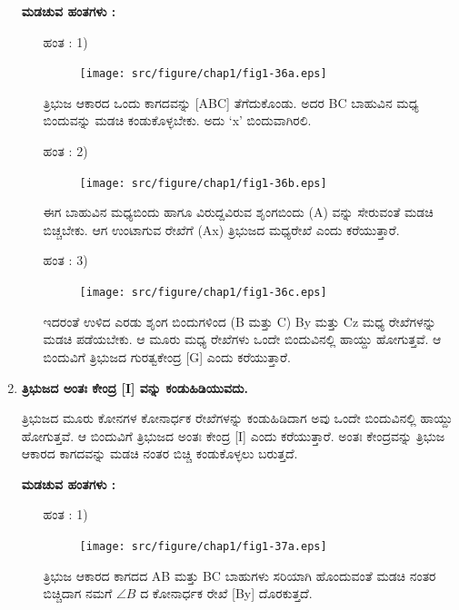 \begin{enumerate}
    \noindent
 \textbf{ಮಡಚುವ ಹಂತಗಳು :}
 
 \begin{itemize}
 \item[ಹಂತ : 1)] 
 ~
 \begin{figure}[H]
\centering
\texttt{[image: src/figure/chap1/fig1-36a.eps]}
\end{figure}
 
ತ್ರಿಭುಜ ಆಕಾರದ ಒಂದು ಕಾಗದವನ್ನು [ABC] ತೆಗೆದುಕೊಂಡು. ಅದರ BC ಬಾಹುವಿನ ಮಧ್ಯ ಬಿಂದುವನ್ನು ಮಡಚಿ ಕಂಡುಕೊಳ್ಳಬೇಕು. ಅದು  `x' ಬಿಂದುವಾಗಿರಲಿ. 
 
 \item[ಹಂತ : 2)]
 ~
 \begin{figure}[H]
\centering
\texttt{[image: src/figure/chap1/fig1-36b.eps]}
\end{figure}
 
 ಈಗ ಬಾಹುವಿನ ಮಧ್ಯಬಿಂದು ಹಾಗೂ ವಿರುದ್ದವಿರುವ ಶೃಂಗಬಿಂದು (A) ವನ್ನು ಸೇರುವಂತೆ ಮಡಚಿ ಬಿಚ್ಚಬೇಕು. ಆಗ ಉಂಟಾಗುವ ರೇಖೆಗೆ (Ax) ತ್ರಿಭುಜದ ಮಧ್ಯರೇಖೆ ಎಂದು ಕರೆಯುತ್ತಾರೆ. 
 
 \item[ಹಂತ : 3)]
 ~
 \begin{figure}[H]
\centering
\texttt{[image: src/figure/chap1/fig1-36c.eps]}
\end{figure}
 
 ಇದರಂತೆ ಉಳಿದ ಎರಡು ಶೃಂಗ ಬಿಂದುಗಳಿಂದ (B ಮತ್ತು C) By ಮತ್ತು  Cz ಮಧ್ಯ ರೇಖೆಗಳನ್ನು ಮಡಚಿ ಪಡೆಯಬೇಕು. ಆ ಮೂರು ಮಧ್ಯ ರೇಖೆಗಳು ಒಂದೇ ಬಿಂದುವಿನಲ್ಲಿ  ಹಾಯ್ದು ಹೋಗುತ್ತವೆ. ಆ ಬಿಂದುವಿಗೆ ತ್ರಿಭುಜದ ಗುರತ್ವಕೇಂದ್ರ  [G] ಎಂದು ಕರೆಯುತ್ತಾರೆ. 
  \end{itemize}
 
 \item \textbf{ತ್ರಿಭುಜದ ಅಂತಃ ಕೇಂದ್ರ [I] ವನ್ನು ಕಂಡುಹಿಡಿಯುವದು. }  
 
 ತ್ರಿಭುಜದ ಮೂರು ಕೋನಗಳ ಕೋನಾರ್ಧಕ ರೇಖೆಗಳನ್ನು ಕಂಡುಹಿಡಿದಾಗ ಅವು ಒಂದೇ ಬಿಂದುವಿನಲ್ಲಿ ಹಾಯ್ದು ಹೋಗುತ್ತವೆ. ಆ ಬಿಂದುವಿಗೆ ತ್ರಿಭುಜದ ಅಂತಃ ಕೇಂದ್ರ [I]  ಎಂದು ಕರೆಯುತ್ತಾರೆ. ಅಂತಃ ಕೇಂದ್ರವನ್ನು ತ್ರಿಭುಜ ಆಕಾರದ ಕಾಗದವನ್ನು ಮಡಚಿ ನಂತರ ಬಿಚ್ಚಿ ಕಂಡುಕೊಳ್ಳಲು ಬರುತ್ತದೆ. 
 
 
 
    \noindent
 \textbf{ಮಡಚುವ ಹಂತಗಳು :}
  \begin{itemize}
 \item[ಹಂತ : 1)] 
 ~
 \begin{figure}[H]
\centering
\texttt{[image: src/figure/chap1/fig1-37a.eps]}
\end{figure}
  
 
 ತ್ರಿಭುಜ ಆಕಾರದ ಕಾಗದದ  AB ಮತ್ತು BC ಬಾಹುಗಳು ಸರಿಯಾಗಿ ಹೊಂದುವಂತೆ ಮಡಚಿ ನಂತರ ಬಿಚ್ಚಿದಾಗ ನಮಗೆ $\angle B$ ದ ಕೋನಾರ್ಧಕ ರೇಖೆ  [By] ದೊರಕುತ್ತದೆ. 
 

\end{itemize}
\end{enumerate}
